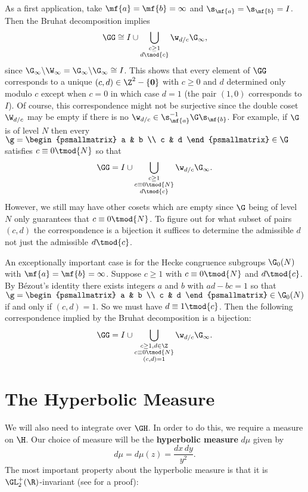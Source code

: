       As a first application, take $\mf{a} = \mf{b} = \infty$ and $\s_{\mf{a}} = \s_{\mf{b}} = I$. Then the Bruhat decomposition implies
      \[
        \GG \cong I\cup\bigcup_{\substack{c \ge 1 \\ d \tmod{c}}}\w_{d/c}\G_{\infty},
      \]
      since $\G_{\infty}\backslash\W_{\infty} = \G_{\infty}\backslash\G_{\infty} \cong I$. This shows that every element of $\GG$ corresponds to a unique $(c,d) \in \Z^{2}-\{\mathbf{0}\}$ with $c \ge 0$ and $d$ determined only modulo $c$ except when $c = 0$ in which case $d = 1$ (the pair $(1,0)$ corresponds to $I$). Of course, this correspondence might not be surjective since the double coset $\W_{d/c}$ may be empty if there is no $\w_{d/c} \in \s_{\mf{a}}^{-1}\G\s_{\mf{b}}$. For example, if $\G$ is of level $N$ then every $\g = \begin{psmallmatrix} a & b \\ c & d \end{psmallmatrix} \in \G$ satisfies $c \equiv 0 \tmod{N}$ so that
      \[
        \GG = I\cup\bigcup_{\substack{c \ge 1 \\ c \equiv 0 \tmod{N} \\ d \tmod{c}}}\w_{d/c}\G_{\infty}.
      \]
      However, we still may have other cosets which are empty since $\G$ being of level $N$ only guarantees that $c \equiv 0 \tmod{N}$. To figure out for what subset of pairs $(c,d)$ the correspondence is a bijection it suffices to determine the admissible $d$ not just the admissible $d \tmod {c}$. 
      
      \begin{remark}\label{rem:Bruhat_bijection}
        An exceptionally important case is for the Hecke congruence subgroups $\G_{0}(N)$ with $\mf{a} = \mf{b} = \infty$. Suppose $c \ge 1$ with $c \equiv 0 \tmod{N}$ and $d \tmod{c}$. By B\'ezout's identity there exists integers $a$ and $b$ with $ad-bc = 1$ so that $\g = \begin{psmallmatrix} a & b \\ c & d \end{psmallmatrix} \in \G_{0}(N)$ if and only if $(c,d) = 1$. So we must have $d \equiv 1 \tmod{c}$. Then the following correspondence implied by the Bruhat decomposition is a bijection:
        \[
          \GG = I\cup\bigcup_{\substack{c \ge 1, d \in \Z \\ c \equiv 0 \tmod{N} \\ (c,d) = 1}}\w_{d/c}\G_{\infty}.
        \]
      \end{remark}
    \section{The Hyperbolic Measure}
      We will also need to integrate over $\GH$. In order to do this, we require a measure on $\H$. Our choice of measure will be the \textbf{hyperbolic measure} $d\mu$ given by
      \[
        d\mu = d\mu(z) = \frac{dx\,dy}{y^{2}}.
      \]
      The most important property about the hyperbolic measure is that it is $\GL_{2}^{+}(\R)$-invariant (see \cite{diamond2005first} for a proof):

